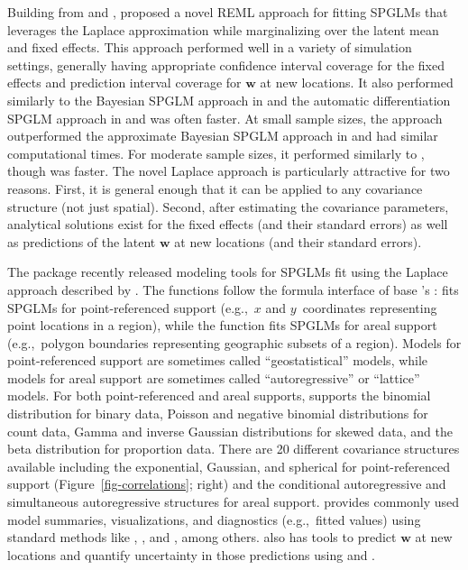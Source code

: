 \documentclass[
]{jss}
\begin{document}
Building from \citet{evangelou2011estimation} and
\citet{bonat2016practical}, \citet{ver2024marginal} proposed a novel
REML approach for fitting SPGLMs that leverages the Laplace
approximation while marginalizing over the latent mean and fixed
effects. This approach performed well in a variety of simulation
settings, generally having appropriate confidence interval coverage for
the fixed effects and prediction interval coverage for \(\mathbf{w}\) at
new locations. It also performed similarly to the Bayesian SPGLM
approach in  and the automatic differentiation SPGLM
approach in  and was often faster. At small sample sizes,
the approach outperformed the approximate Bayesian SPGLM approach in
 and had similar computational times. For moderate sample
sizes, it performed similarly to , though  was
faster. The novel Laplace approach is particularly attractive for two
reasons. First, it is general enough that it can be applied to any
covariance structure (not just spatial). Second, after estimating the
covariance parameters, analytical solutions exist for the fixed effects
(and their standard errors) as well as predictions of the latent
\(\mathbf{w}\) at new locations (and their standard errors).

The   package \citep{dumelle2023spmodel}
recently released modeling tools for SPGLMs fit using the Laplace
approach described by \citet{ver2024marginal}. The functions follow the
formula interface of base 's : 
fits SPGLMs for point-referenced support (e.g.,~\(x\) and
\(y\)~coordinates representing point locations in a region), while the
 function fits SPGLMs for areal support (e.g.,~polygon
boundaries representing geographic subsets of a region). Models for
point-referenced support are sometimes called ``geostatistical'' models,
while models for areal support are sometimes called ``autoregressive''
or ``lattice'' models. For both point-referenced and areal supports,
 supports the binomial distribution for binary data,
Poisson and negative binomial distributions for count data, Gamma and
inverse Gaussian distributions for skewed data, and the beta
distribution for proportion data. There are 20 different covariance
structures available including the exponential, Gaussian, and spherical
for point-referenced support (Figure~\ref{fig-correlations}; right) and
the conditional autoregressive and simultaneous autoregressive
structures for areal support.  provides commonly used model
summaries, visualizations, and diagnostics (e.g.,~fitted values) using
standard  methods like , , and
, among others.  also has tools to predict
\(\mathbf{w}\) at new locations and quantify uncertainty in those
predictions using  and .
\end{document}
